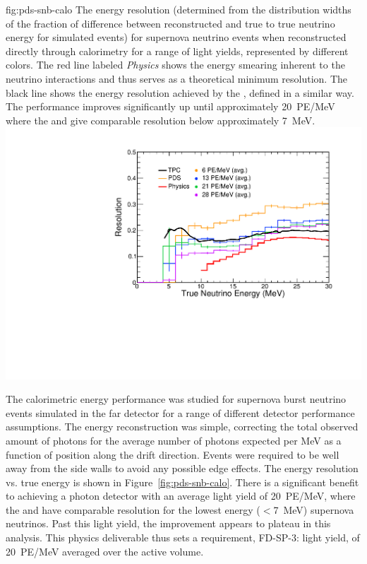 \begin{dunefigure}
{fig:pds-snb-calo}
{The energy resolution (determined from the distribution widths of the fraction of difference between reconstructed and true  to true neutrino energy for simulated events) for supernova neutrino events when reconstructed directly through  calorimetry for a range of light yields, represented by different colors. The red line labeled \textit{Physics} 
shows the energy smearing inherent to the neutrino interactions and thus serves as a theoretical minimum resolution. The black line shows the energy resolution achieved by the , defined in a similar way. The performance improves significantly up until approximately \SI{20}{PE/MeV} where the  and  give comparable resolution below approximately \SI{7}{MeV}.
}
  \includegraphics[width=0.6\columnwidth]{graphics/pds-snb-res-vs-true.pdf}
 \end{dunefigure}

The calorimetric energy performance was studied for supernova burst neutrino events simulated in the far detector for a range of different detector performance assumptions. The energy reconstruction was simple, correcting the total observed amount of photons for the average number of photons expected per MeV as a function of position along the drift direction. Events were required to be well away from the side walls to avoid any possible edge effects. The energy resolution vs. true energy is shown in Figure~\ref{fig:pds-snb-calo}. There is a significant benefit to achieving a photon detector with an average light yield of \SI{20}{PE/MeV}, where the  and  have comparable resolution for the lowest energy ($<$\SI{7}{MeV}) supernova neutrinos. Past this light yield, the improvement appears to plateau in this analysis. This physics deliverable thus sets a requirement, FD-SP-3: light yield, of \SI{20}{PE/MeV} averaged over the active volume.


